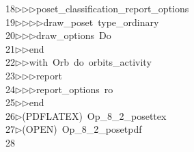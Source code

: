 \begin{tabbing}
18\>$\triangleright$\>$\triangleright$\>$\triangleright$\>poset\_classification\_report\_options\ \\[0pt]
19\>$\triangleright$\>$\triangleright$\>$\triangleright$\>$\triangleright$\>draw\_poset\ type\_ordinary\ \\[0pt]
20\>$\triangleright$\>$\triangleright$\>$\triangleright$\>draw\_options\ Do\ \\[0pt]
21\>$\triangleright$\>$\triangleright$\>end\ \\[0pt]
22\>$\triangleright$\>$\triangleright$\>with\ Orb\ do\ orbits\_activity\ \\[0pt]
23\>$\triangleright$\>$\triangleright$\>$\triangleright$\>report\ \ \\[0pt]
24\>$\triangleright$\>$\triangleright$\>$\triangleright$\>report\_options\ ro\ \\[0pt]
25\>$\triangleright$\>$\triangleright$\>end\ \\[0pt]
26\>$\triangleright$\>(PDFLATEX)\ Op\_8\_2\_posettex\\[0pt]
27\>$\triangleright$\>(OPEN)\ Op\_8\_2\_posetpdf\\[0pt]
28\>\end{tabbing}
